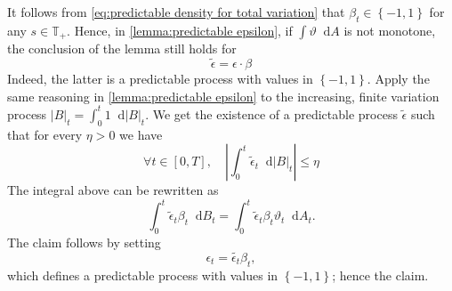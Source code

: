 \documentclass[11pt,a4paper,twoside,openany]{report}
\newcommand{\diff}{\mathop{}\!\mathrm{d}}
\theoremstyle{plain} %
\theoremstyle{definition} %
\theoremstyle{remark} %
\begin{document}
It follows from \cref{eq:predictable density for total variation} that \(\beta_t\in\left\{-1,1\right\}\) for any \(s\in\mathbb{T}_+\). Hence, in \cref{lemma:predictable epsilon}, if \(\int \vartheta\diff A\) is not monotone, the conclusion of the lemma still holds for 
\begin{equation}
    \widetilde{\epsilon}=\epsilon\cdot\beta
\end{equation}
Indeed, the latter is a predictable process with values in \(\left\{-1,1\right\}\). Apply the same reasoning in \cref{lemma:predictable epsilon} to the increasing, finite variation process \(|B|_t=\int_0^t 1\diff|B|_t\). We get the existence of a predictable process \(\widetilde{\epsilon}\) such that for every \(\eta>0\) we have 
\begin{equation}
    \forall t\in[0,T],\quad\left|\int_0^t\widetilde{\epsilon}_t\diff|B|_t\right|\leq\eta
\end{equation}
The integral above can be rewritten as
\begin{equation}
    \int_0^t\widetilde{\epsilon}_t\beta_t\diff B_t=\int_0^t\widetilde{\epsilon}_t\beta_t\vartheta_t\diff A_t.
\end{equation}
The claim follows by setting 
\begin{equation}
    \epsilon_t=\widetilde{\epsilon_t}\beta_t,
\end{equation}
which defines a predictable process with values in \(\left\{-1,1\right\}\); hence the claim.
\end{document}
